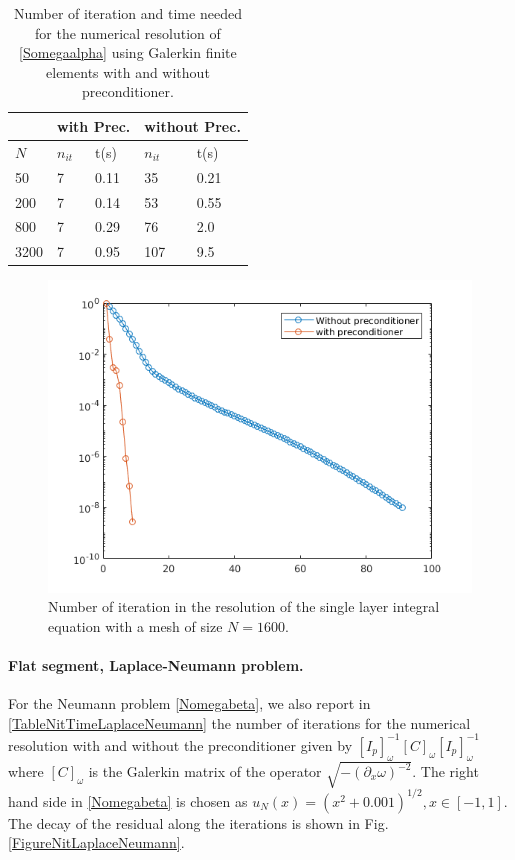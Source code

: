 \documentclass[a4paper]{article}
\begin{document}
\begin{table}[H]
	\begin{center}
		\begin{tabular}{m{4em}|m{4em}|m{4em}|m{4em}| m{4em}} 
			\hline
			\multicolumn{1}{c|}{ }&
			\multicolumn{2}{c|}{with Prec.}&\multicolumn{2}{c}{without Prec.}\\
			\hline
			$N$ & $n_{it}$& t(s) & $n_{it}$ & t(s)\\
			\hline\hline
			50 & 7 & 0.11 & 35 & 0.21\\
			\hline
			200 & 7 & 0.14 & 53 & 0.55\\
			\hline
			800 & 7 & 0.29 & 76 & 2.0 \\
			\hline
			3200 & 7 & 0.95 & 107 & 9.5\\
			\hline
		\end{tabular}
		\caption{Number of iteration and time needed for the numerical resolution of \eqref{Somegaalpha} using Galerkin finite elements with and without preconditioner.}
		\label{TableNitTimeLaplaceDirichlet}
	\end{center}
\end{table}
\begin{figure}[H]
	\centering
	\includegraphics[scale=0.7]{figs/PrecondDirichletLaplaceSeg.png}
	\caption{Number of iteration in the resolution of the single layer integral equation with a mesh of size $N = 1600$.}
	\label{FigureNitLaplaceDirichlet}
\end{figure}

\paragraph{Flat segment, Laplace-Neumann problem.} 
For the Neumann problem \eqref{Nomegabeta}, we also report in \autoref{TableNitTimeLaplaceNeumann} the number of iterations for the 
numerical resolution with and without the preconditioner given by $[I_p]^{-1}_{\omega} \left[C \right]_\omega [I_p]^{-1}_{\omega}$ where $\left[ C \right]_\omega$ 
is the Galerkin matrix of the operator $\sqrt{ -( \partial_x \omega)^{-2}}$. The right hand side in \eqref{Nomegabeta} is chosen as 
$u_N(x) = (x^2 + 0.001)^{1/2}, x \in [-1,1]$. The decay of the residual along the iterations is shown in Fig. \ref{FigureNitLaplaceNeumann}.
\end{document}
